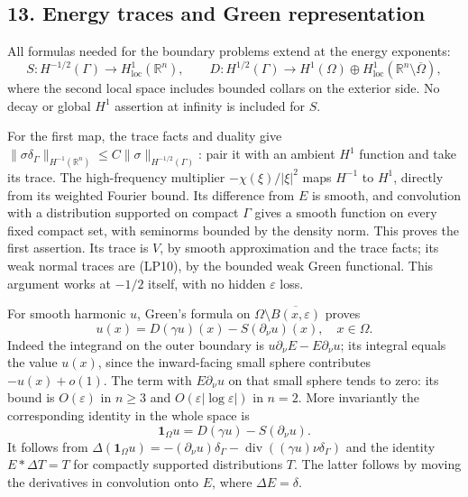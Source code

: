 \documentclass[
  11pt,
]{article}
\makeatletter
\let\ReaderOriginalAnchorStart\hyper@anchorstart
\let\ReaderOriginalAnchorEnd\hyper@anchorend
\let\ReaderPendingAliases\@empty
\def\ReaderArmAliases#1{\gdef\ReaderPendingAliases{#1}}
\def\hyper@anchorstart#1{\ReaderIfNativeAnchorTF{#1}{\ReaderPendingAliases\global\let\ReaderPendingAliases\@empty}{}\ReaderOriginalAnchorStart{#1}}
\makeatother
\begin{document}
\ReaderArmAliases{\ReaderOriginalAnchorStart{AN03-SBD-013}\ReaderOriginalAnchorEnd\begingroup\expandafter\def\csname @currentHref\endcsname{AN03-SBD-013}\label{AN03-SBD-013}\endgroup\ReaderOriginalAnchorStart{an03-sbd-013-energy-traces-and-green-representation}\ReaderOriginalAnchorEnd\begingroup\expandafter\def\csname @currentHref\endcsname{an03-sbd-013-energy-traces-and-green-representation}\label{an03-sbd-013-energy-traces-and-green-representation}\endgroup\ReaderOriginalAnchorStart{13-energy-traces-and-green-representation}\ReaderOriginalAnchorEnd\begingroup\expandafter\def\csname @currentHref\endcsname{13-energy-traces-and-green-representation}\label{13-energy-traces-and-green-representation}\endgroup\ReaderOriginalAnchorStart{energy-traces-and-green-representation}\ReaderOriginalAnchorEnd}
\subsection{13. Energy traces and Green
representation}\label{energy-traces-and-green-representation}

All formulas needed for the boundary problems extend at the energy
exponents: \[
 S:H^{-1/2}(\Gamma)\to H^1_{\mathrm{loc}}(\mathbb R^n),\qquad
 D:H^{1/2}(\Gamma)\to
 H^1(\Omega)\oplus H^1_{\mathrm{loc}}(\mathbb R^n\setminus\overline\Omega),
 \tag{LP13}
\] where the second local space includes bounded collars on the exterior
side. No decay or global \(H^1\) assertion at infinity is included for
\(S\).

For the first map, the trace facts and duality give
\(\|\sigma\delta_\Gamma\|_{H^{-1}(\mathbb R^n)}\le C\|\sigma\|_{H^{-1/2}(\Gamma)}\):
pair it with an ambient \(H^1\) function and take its trace. The
high-frequency multiplier \(-\chi(\xi)/|\xi|^2\) maps \(H^{-1}\) to
\(H^1\), directly from its weighted Fourier bound. Its difference from
\(E\) is smooth, and convolution with a distribution supported on
compact \(\Gamma\) gives a smooth function on every fixed compact set,
with seminorms bounded by the density norm. This proves the first
assertion. Its trace is \(V\), by smooth approximation and the trace
facts; its weak normal traces are (LP10), by the bounded weak Green
functional. This argument works at \(-1/2\) itself, with no hidden
\(\varepsilon\) loss.

For smooth harmonic \(u\), Green's formula on
\(\Omega\setminus\overline{B(x,\varepsilon)}\) proves \[
 u(x)=D(\gamma u)(x)-S(\partial_\nu u)(x),\quad x\in\Omega.
 \tag{LP14}
\] Indeed the integrand on the outer boundary is
\(u\partial_\nu E-E\partial_\nu u\); its integral equals the value
\(u(x)\), since the inward-facing small sphere contributes
\(-u(x)+o(1)\). The term with \(E\partial_\nu u\) on that small sphere
tends to zero: its bound is \(O(\varepsilon)\) in \(n\ge3\) and
\(O(\varepsilon|\log\varepsilon|)\) in \(n=2\). More invariantly the
corresponding identity in the whole space is \[
 \mathbf1_\Omega u=D(\gamma u)-S(\partial_\nu u).
 \tag{LP15}
\] It follows from
\(\Delta(\mathbf1_\Omega u)=-(\partial_\nu u)\delta_\Gamma-\operatorname{div}((\gamma u)\nu\delta_\Gamma)\)
and the identity \(E*\Delta T=T\) for compactly supported distributions
\(T\). The latter follows by moving the derivatives in convolution onto
\(E\), where \(\Delta E=\delta\).
\end{document}
